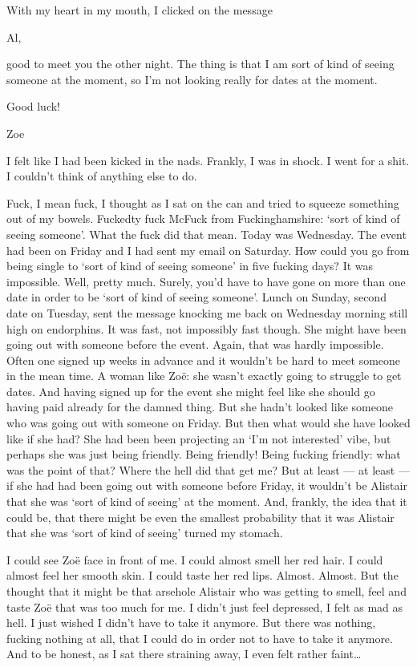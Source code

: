 With my heart in my mouth, I clicked on the message

{\twelvett Al,

good to meet you the other night. The thing is that I am sort of
kind of seeing someone at the moment, so I'm not looking really for
dates at the moment.

Good luck!

Zoe}

I felt like I had been kicked in the nads. Frankly, I was in shock.
I went for a shit. I couldn't think of anything else to do.

Fuck, I mean fuck, I thought as I sat on the can and tried to
squeeze something out of my bowels. Fuckedty fuck McFuck from
Fuckinghamshire: `sort of kind of seeing someone'. What the fuck did
that mean. Today was Wednesday. The event had been on Friday and I
had sent my email on Saturday. How could you go from being single to
`sort of kind of seeing someone' in five fucking days? It was
impossible. Well, pretty much. Surely, you'd have to have gone on
more than one date in order to be `sort of kind of seeing someone'.
Lunch on Sunday, second date on Tuesday, sent the message knocking
me back on Wednesday morning still high on endorphins. It was fast,
not impossibly fast though. She might have been going out with
someone before the event. Again, that was hardly impossible. Often
one signed up weeks in advance and it wouldn't be hard to meet
someone in the mean time. A woman like Zo{\"e}: she wasn't exactly
going to struggle to get dates. And having signed up for the event
she might feel like she should go having paid already for the damned
thing. But she hadn't looked like someone who was going out with
someone on Friday. But then what would she have looked like if she
had? She had been been projecting an `I'm not interested' vibe, but
perhaps she was just being friendly. Being friendly! Being fucking
friendly: what was the point of that? Where the hell did that get
{\twelveit me\/}? But at least --- {\twelveit at least} --- if she
had had been going out with someone before Friday, it wouldn't be
Alistair that she was `sort of kind of seeing' at the moment. And,
frankly, the idea that it could be, that there might be even the
smallest probability that it was Alistair that she was `sort of kind
of seeing' turned my stomach.

I could see Zo{\"e} face in front of me. I could almost smell her
red hair. I could almost feel her smooth skin. I could taste her red
lips. Almost. Almost. But the thought that it might be that arsehole
Alistair who was getting to smell, feel and taste Zo{\"e} that was
too much for me. I didn't just feel depressed, I felt as mad as
hell. I just wished I didn't have to take it anymore. But there was
nothing, fucking nothing at all, that I could do in order not to
have to take it anymore. And to be honest, as I sat there straining
away, I even felt rather faint\dots

